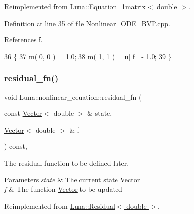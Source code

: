 Reimplemented from \hyperlink{classLuna_1_1Equation__1matrix_a2501535a6e92abc491bc491b3f64dc06}{Luna\+::\+Equation\+\_\+1matrix$<$ double $>$}.



Definition at line 35 of file Nonlinear\+\_\+\+O\+D\+E\+\_\+\+B\+V\+P.\+cpp.



References f.


\begin{DoxyCode}
36       \{
37         m( 0, 0 ) = 1.0;
38         m( 1, 1 ) = \hyperlink{namespaceHeat__plot_ae622b86afa46daa3e9b887624ab1bf26}{u}[ \hyperlink{Nonlinear__ODE__BVP_8cpp_a06fc87d81c62e9abb8790b6e5713c55ba7ce756344023b99e5ab27b804feb765c}{f} ] - 1.0;
39       \}
\end{DoxyCode}
\mbox{\label{classLuna_1_1nonlinear__equation_a5acffbdc83b8b487241cd92b0191be85}} 
\subsubsection{\texorpdfstring{residual\+\_\+fn()}{residual\_fn()}}
{\footnotesize\ttfamily void Luna\+::nonlinear\+\_\+equation\+::residual\+\_\+fn (\begin{DoxyParamCaption}\item[{const \hyperlink{classLuna_1_1Vector}{Vector}$<$ double $>$ \&}]{state,  }\item[{\hyperlink{classLuna_1_1Vector}{Vector}$<$ double $>$ \&}]{f }\end{DoxyParamCaption}) const\hspace{0.3cm}{\ttfamily [inline]}, {\ttfamily [virtual]}}



The residual function to be defined later. 


\begin{DoxyParams}{Parameters}
{\em state} & The current state \hyperlink{classLuna_1_1Vector}{Vector} \\
\hline
{\em f} & The function \hyperlink{classLuna_1_1Vector}{Vector} to be updated \\
\hline
\end{DoxyParams}


Reimplemented from \hyperlink{classLuna_1_1Residual_ae1b1ebe3314c788b176bcac7b328de5c}{Luna\+::\+Residual$<$ double $>$}.



